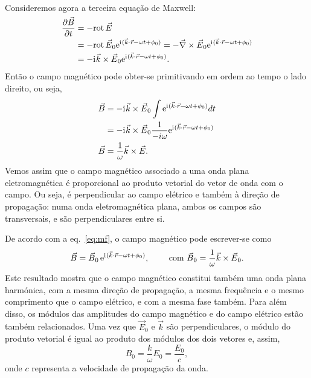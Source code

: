Consideremos agora a terceira equação de Maxwell:
\begin{align*}
  \pd{\vec B}{t}&=-\rot\vec E\\
                &=-\rot \vec E_0\e^{\iu(\vec k\cdot\vec r-\omega t+\phi_0)}
  =-\vec \nabla\times\vec E_0\e^{\iu(\vec k\cdot\vec r-\omega t+\phi_0)}\\
  &=-\iu\vec k\times\vec E_0\e^{\iu(\vec k\cdot\vec r-\omega t+\phi_0)}.
\end{align*}
Então o campo magnético pode obter-se primitivando em ordem ao tempo o lado
direito, ou seja,
\begin{align}
  \vec B&=-\iu\vec k\times\vec E_0\int\e^{\iu(\vec k\cdot\vec r-\omega
          t+\phi_0)}dt\nonumber\\
          &=-\iu\vec k\times\vec E_0\frac{1}{-i\omega}
            \e^{\iu(\vec k\cdot\vec r-\omega t+\phi_0)}\nonumber\\
            \vec B&=\frac{1}{\omega}\vec k\times \vec E.\label{eq:mf}
\end{align}
Vemos assim que o campo magnético associado a uma onda plana eletromagnética é
proporcional ao produto vetorial do vetor de onda com o campo. Ou seja,
é perpendicular ao campo elétrico e também à direção de propagação: numa onda
eletromagnética plana, ambos os campos são transversais, e são perpendiculares
entre si. 

De acordo com a eq.~\eqref{eq:mf}, o campo magnético pode escrever-se como
\begin{equation*}
  \vec B=\vec B_0\,\e^{\iu(\vec k\cdot\vec r-\omega t+\phi_0)},\qquad
  \text{ com } 
  \vec B_0=\frac{1}{\omega}\vec k\times\vec E_0.
\end{equation*}
Este resultado mostra que o campo magnético constitui também uma onda plana
harmónica, com a mesma direção de propagação, a mesma frequência e o mesmo
comprimento que o campo elétrico, e com a mesma fase também. Para além disso, os
módulos das amplitudes do campo magnético e do campo elétrico estão também
relacionados. Uma vez que $\vec E_0$ e $\vec k$ são perpendiculares, o módulo do
produto vetorial é igual ao produto dos módulos dos dois vetores e, assim,
\begin{equation}
  B_0 = \frac{k}{\omega}E_0=\frac{E_0}{c},
\end{equation}
onde $c$ representa a velocidade de propagação da onda.

